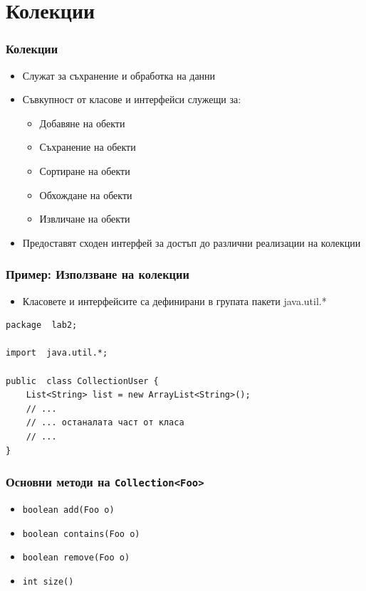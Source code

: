 \documentclass[ignorenonframetext, hyperref=unicode,compress]{beamer}
\begin{document}
\section{Колекции}

\begin{frame}[containsverbatim]\frametitle{Колекции}
\begin{itemize}
 \item Служат за съхранение и обработка на данни
 \item Съвкупност от класове и интерфейси служещи за:
\begin{itemize}
	\item Добавяне на обекти
	\item Съхранение на обекти
	\item Сортиране на обекти
	\item Обхождане на обекти
	\item Извличане на обекти
\end{itemize}
 \item Предоставят сходен интерфей за достъп до различни реализации на колекции
\end{itemize}
\end{frame}

\begin{frame}[containsverbatim]\frametitle{Пример: Използване на колекции}
\begin{itemize}
 \item Класовете и интерфейсите са дефинирани в групата пакети java.util.*
\end{itemize}
\begin{lstlisting}
package  lab2;

import  java.util.*;

public  class CollectionUser {
 	List<String> list = new ArrayList<String>();
	// ...
 	// ... останалата част от класа
	// ...
}
\end{lstlisting}
\end{frame}

\begin{frame}[containsverbatim]\frametitle{Основни методи на \lstinline{Collection<Foo>}}
\begin{itemize}
 \item \lstinline{boolean add(Foo o)}
 \item \lstinline{boolean contains(Foo o)}
 \item \lstinline{boolean remove(Foo o)}
 \item \lstinline{int size()}
\end{itemize}
\end{frame}
\end{document}
